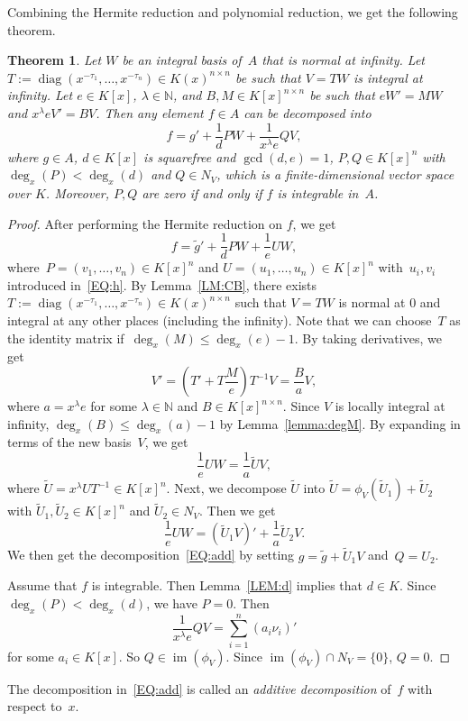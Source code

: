 \documentclass{sig-alternate}
\newtheorem{theorem}{Theorem}
\newcommand{\bN}{ {\mathbb N}}
\def\im{\operatorname{im}}
\def\diag{\operatorname{diag}}
\begin{document}
Combining the Hermite reduction and polynomial reduction, we get the following theorem.
\begin{theorem}\label{THM:polyred}
Let $W$ be an integral basis of~$A$ that is normal at infinity.
Let $T := \diag(x^{-\tau_1}, \ldots, x^{-\tau_n}) \in K(x)^{n\times n}$
be such that $V = TW$ is integral at infinity.
Let $e\in K[x]$, $\lambda \in \bN$, and $B, M \in K[x]^{n \times n} $ be such that
$eW' = MW$ and $x^\lambda eV' = BV$.
Then any element $f\in A$ can be decomposed into
\begin{equation}\label{EQ:add}
f = g' + \frac{1}{d} PW + \frac{1}{x^\lambda e} QV,
\end{equation}
where $g\in A$, $d\in K[x]$ is squarefree and $\gcd(d, e)=1$, $P, Q\in K[x]^n$ with $\deg_x(P) < \deg_x(d)$ and $Q\in N_V$, which is
a finite-dimensional vector space over $K$. Moreover, $P, Q$ are zero if and only if $f$ is integrable in~$A$.
\end{theorem}
\begin{proof}
After performing the Hermite reduction on $f$, we get
\[f = \tilde{g}' + \frac{1}{d} PW + \frac{1}{e} UW,\]
where~$P = (v_1, \ldots, v_n)\in K[x]^n$ and $U = (u_1, \ldots, u_n)\in K[x]^n$
with~$u_i, v_i$ introduced in~\eqref{EQ:h}. By Lemma~\ref{LM:CB}, there exists
$T := \diag(x^{-\tau_1}, \ldots, x^{-\tau_n}) \in K(x)^{n\times n}$
such that $V = TW$ is normal at $0$ and integral at any other places (including the infinity). Note that we can
choose~$T$ as the identity matrix if~$\deg_x(M)\leq \deg_x(e)-1$.
By taking derivatives, we get
\[V' = \left(T' + T\frac{M}{e}\right)T^{-1}V = \frac{B}{a}V, \]
where $a=x^\lambda e$ for some $\lambda\in \bN$ and $B\in K[x]^{n\times n}$. Since $V$ is locally integral
at infinity, $\deg_x(B) \leq \deg_x(a)-1$ by Lemma~\ref{lemma:degM}.
By expanding in terms of the new basis~$V$, we get
\[\frac{1}{e} UW = \frac{1}{a} \tilde{U}V, \]
where $\tilde{U} = x^\lambda U T^{-1} \in K[x]^n$. Next, we decompose $\tilde{U}$ into
$\tilde{U} = \phi_{V}(\tilde{U}_1) + \tilde{U}_2$ with $\tilde{U}_1, \tilde{U}_2\in K[x]^n$ and
$\tilde{U}_2\in N_V$. Then we get
\[\frac{1}{e} UW = (\tilde U_1 V)' + \frac{1}{a} \tilde U_2 V. \]
We then get the decomposition~\eqref{EQ:add} by setting
$g = \tilde g + \tilde U_1 V$ and~$Q = U_2$.

Assume that $f$ is integrable. Then Lemma~\ref{LEM:d} implies that $d\in K$.
Since $\deg_x(P) < \deg_x(d)$, we have $P=0$. Then
\[\frac{1}{x^\lambda e} QV = \sum_{i=1}^n (a_i \nu_i)'\]
for some $a_i\in K[x]$. So $Q \in \im(\phi_V)$.
Since $\im(\phi_V) \cap N_V = \{0\}$, $Q=0$.
\end{proof}
The decomposition in~\eqref{EQ:add} is called an \emph{additive decomposition} of~$f$ with respect to~$x$.
\end{document}
